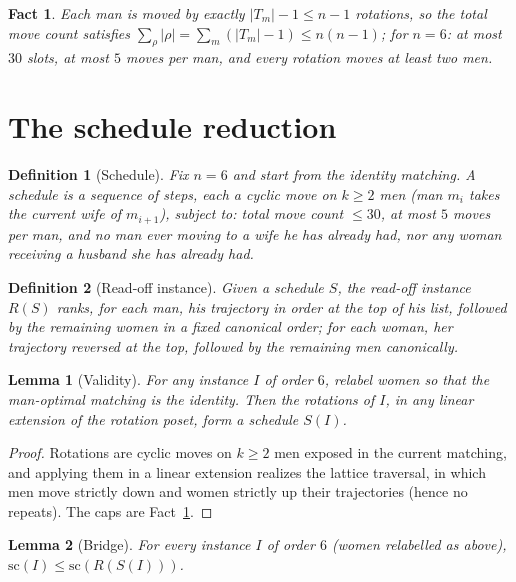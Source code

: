 \documentclass[11pt]{article}
\newtheorem{lemma}{Lemma}
\newtheorem{definition}{Definition}
\newtheorem{fact}{Fact}
\begin{document}
\begin{fact}\label{fact:budget}
Each man is moved by exactly $|T_m|-1\le n-1$ rotations, so the total move count satisfies
$\sum_\rho |\rho| = \sum_m (|T_m|-1)\le n(n-1)$; for $n=6$: at most $30$ slots, at most $5$ moves
per man, and every rotation moves at least two men.
\end{fact}

\section{The schedule reduction}\label{sec:reduction}

\begin{definition}[Schedule]\label{def:sched}
Fix $n=6$ and start from the identity matching. A \emph{schedule} is a sequence of \emph{steps},
each a cyclic move on $k\ge 2$ men (man $m_i$ takes the current wife of $m_{i+1}$), subject to:
total move count $\le 30$, at most $5$ moves per man, and no man ever moving to a wife he has
already had, nor any woman receiving a husband she has already had.
\end{definition}

\begin{definition}[Read-off instance]\label{def:readoff}
Given a schedule $S$, the read-off instance $R(S)$ ranks, for each man, his trajectory in order at
the top of his list, followed by the remaining women in a fixed canonical order; for each woman,
her trajectory \emph{reversed} at the top, followed by the remaining men canonically.
\end{definition}

\begin{lemma}[Validity]\label{lem:valid}
For any instance $I$ of order $6$, relabel women so that the man-optimal matching is the identity.
Then the rotations of $I$, in any linear extension of the rotation poset, form a schedule $S(I)$.
\end{lemma}

\begin{proof}
Rotations are cyclic moves on $k\ge 2$ men exposed in the current matching, and applying them in a
linear extension realizes the lattice traversal, in which men move strictly down and women strictly
up their trajectories (hence no repeats). The caps are Fact~\ref{fact:budget}.
\end{proof}

\begin{lemma}[Bridge]\label{lem:bridge}
For every instance $I$ of order $6$ (women relabelled as above),
$\mathrm{sc}(I)\le\mathrm{sc}(R(S(I)))$.
\end{lemma}
\end{document}
